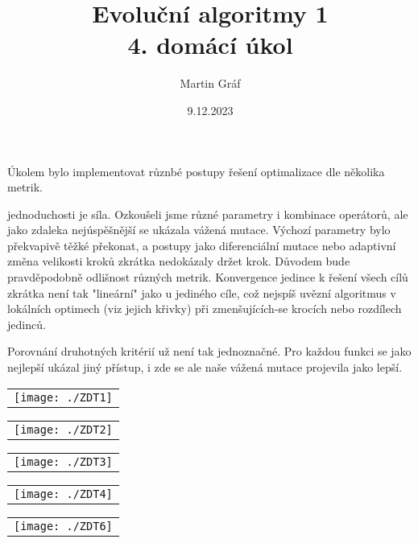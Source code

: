 \documentclass[a4paper]{article}
\newenvironment{ukol}[3][]{\begin{trivlist} 
\item[\hskip \labelsep {\bfseries #1}\hskip \labelsep {\bfseries #2}]}{\end{trivlist}}
\begin{document}
 
 
\title{ Evoluční algoritmy 1 \\ 4. domácí úkol
        } 
\author{Martin Gráf}
\date{9.12.2023}

\maketitle

Úkolem bylo implementovat různbé postupy řešení optimalizace dle několika metrik.

\begin{ukol}{Experimenty}

V jednoduchosti je síla. Ozkoušeli jsme různé parametry i kombinace operátorů, ale jako zdaleka nejúspěšnější se ukázala vážená mutace. Výchozí parametry bylo překvapivě těžké překonat, a postupy jako diferenciální mutace nebo adaptivní změna velikosti kroků zkrátka nedokázaly držet krok. Důvodem bude pravděpodobně odlišnost různých metrik. Konvergence jedince k řešení všech cílů zkrátka není tak "lineární" jako u jediného cíle, což nejspíš uvězní algoritmus v lokálních optimech (viz jejich křivky) při zmenšujících-se krocích nebo rozdílech jedinců. 

Porovnání druhotných kritérií už není tak jednoznačné. Pro každou funkci se jako nejlepší ukázal jiný přístup, i zde se ale naše vážená mutace projevila jako lepší.

\begin{center}
	\begin{tabular}{ c }
		\texttt{[image: ./ZDT1]}
	\end{tabular}
	\begin{tabular}{ c }
		\texttt{[image: ./ZDT2]}
	\end{tabular} 
	\begin{tabular}{ c }
		\texttt{[image: ./ZDT3]}
	\end{tabular} 
	\begin{tabular}{ c }
		\texttt{[image: ./ZDT4]}
	\end{tabular}
	\begin{tabular}{ c }
		\texttt{[image: ./ZDT6]}
	\end{tabular}
\end{center}

\end{ukol}
\end{document}
